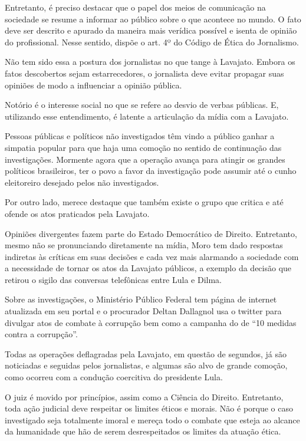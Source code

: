Entretanto, é preciso destacar que o papel dos meios de comunicação na
sociedade se resume a informar ao público sobre o que acontece no mundo.
O fato deve ser descrito e apurado da maneira mais verídica possível e
isenta de opinião do profissional. Nesse sentido, dispõe o art. 4º do
Código de Ética do Jornalismo.

Não tem sido essa a postura dos jornalistas no que tange à Lavajato.
Embora os fatos descobertos sejam estarrecedores, o jornalista deve
evitar propagar suas opiniões de modo a influenciar a opinião pública.

Notório é o interesse social no que se refere ao desvio
de verbas públicas. E, utilizando esse entendimento, é latente a
articulação da mídia com a Lavajato.

Pessoas públicas e políticos não investigados têm vindo a público ganhar
a simpatia popular para que haja uma comoção no sentido de continuação
das investigações. Mormente agora que a operação avança para atingir os
grandes políticos brasileiros, ter o povo a favor da investigação pode
assumir até o cunho eleitoreiro desejado pelos não investigados.

Por outro lado, merece destaque que também existe o grupo que critica e
até ofende os atos praticados pela Lavajato.

Opiniões divergentes fazem parte do Estado Democrático de Direito.
Entretanto, mesmo não se pronunciando diretamente na mídia, Moro tem
dado respostas indiretas às críticas em suas decisões e cada vez mais
alarmando a sociedade com a necessidade de tornar os atos da Lavajato
públicos, a exemplo da decisão que retirou o sigilo das conversas
telefônicas entre Lula e Dilma.

Sobre as investigações, o Ministério Público Federal tem página de
internet atualizada em seu portal e o procurador Deltan Dallagnol usa o
twitter para divulgar atos de combate à corrupção bem como a campanha do
 de ``10 medidas contra a corrupção''.

Todas as operações deflagradas pela Lavajato, em questão de segundos, já
são noticiadas e seguidas pelos jornalistas, e algumas são alvo de
grande comoção, como ocorreu com a condução coercitiva do presidente
Lula.

O juiz é movido por princípios, assim como a Ciência do Direito.
Entretanto, toda ação judicial deve respeitar os limites éticos e
morais. Não é porque o caso investigado seja totalmente imoral e mereça
todo o combate que esteja ao alcance da humanidade que hão de serem
desrespeitados os limites da atuação ética.

